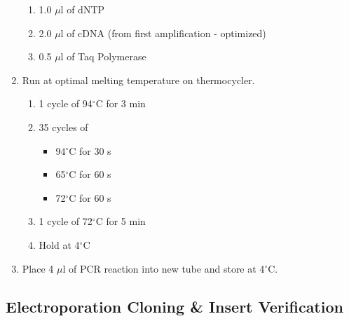 \begin{enumerate}
\begin{enumerate}
  \item 1.0 $\mu$l of dNTP
  \item 2.0 $\mu$l of cDNA (from first amplification - optimized)
  \item 0.5 $\mu$l of Taq Polymerase
  \end{enumerate}
\item Run at optimal melting temperature on thermocycler.
  \begin{enumerate}
      \item 1 cycle of 94$^{\circ}$C for 3 min
  \item 35 cycles of
    \begin{itemize}
    \item 94$^{\circ}$C for 30 s
    \item 65$^{\circ}$C for 60 s
    \item 72$^{\circ}$C for 60 s
    \end{itemize}
  \item 1 cycle of 72$^{\circ}$C for 5 min
  \item Hold at 4$^{\circ}$C
  \end{enumerate}
\item Place 4 $\mu$l of PCR reaction into new tube and store at 4$^{\circ}$C.
\end{enumerate}

\subsection{Electroporation Cloning \& Insert Verification}


